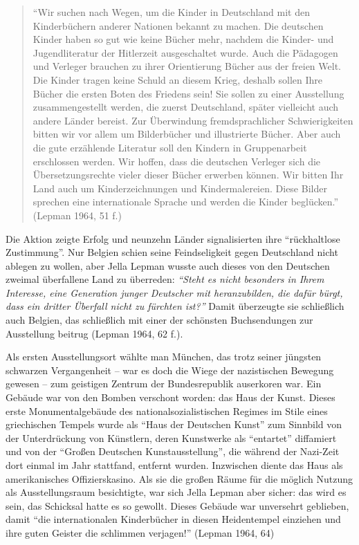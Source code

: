 \documentclass[a4paper,
fontsize=11pt,
oneside,
numbers=noperiodatend,
parskip=half-,
bibliography=totoc,
final
]{scrartcl}
\begin{document}
\begin{quote}
\enquote{Wir suchen nach Wegen, um die Kinder in Deutschland mit den
Kinderbüchern anderer Nationen bekannt zu machen. Die deutschen Kinder
haben so gut wie keine Bücher mehr, nachdem die Kinder- und
Jugendliteratur der Hitlerzeit ausgeschaltet wurde. Auch die Pädagogen
und Verleger brauchen zu ihrer Orientierung Bücher aus der freien Welt.
Die Kinder tragen keine Schuld an diesem Krieg, deshalb sollen Ihre
Bücher die ersten Boten des Friedens sein! Sie sollen zu einer
Ausstellung zusammengestellt werden, die zuerst Deutschland, später
vielleicht auch andere Länder bereist. Zur Überwindung fremdsprachlicher
Schwierigkeiten bitten wir vor allem um Bilderbücher und illustrierte
Bücher. Aber auch die gute erzählende Literatur soll den Kindern in
Gruppenarbeit erschlossen werden. Wir hoffen, dass die deutschen
Verleger sich die Übersetzungsrechte vieler dieser Bücher erwerben
können. Wir bitten Ihr Land auch um Kinderzeichnungen und
Kindermalereien. Diese Bilder sprechen eine internationale Sprache und
werden die Kinder beglücken.} (Lepman 1964, 51 f.)
\end{quote}

Die Aktion zeigte Erfolg und neunzehn Länder signalisierten ihre
\enquote{rückhaltlose Zustimmung}. Nur Belgien schien seine
Feindseligkeit gegen Deutschland nicht ablegen zu wollen, aber Jella
Lepman wusste auch dieses von den Deutschen zweimal überfallene Land zu
überreden: \emph{\enquote{Steht es nicht besonders in Ihrem Interesse,
eine Generation junger Deutscher mit heranzubilden, die dafür bürgt,
dass ein dritter Überfall nicht zu fürchten ist?}} Damit überzeugte sie
schließlich auch Belgien, das schließlich mit einer der schönsten
Buchsendungen zur Ausstellung beitrug (Lepman 1964, 62 f.).

Als ersten Ausstellungsort wählte man München, das trotz seiner jüngsten
schwarzen Vergangenheit -- war es doch die Wiege der nazistischen
Bewegung gewesen -- zum geistigen Zentrum der Bundesrepublik auserkoren
war. Ein Gebäude war von den Bomben verschont worden: das Haus der
Kunst. Dieses erste Monumentalgebäude des nationalsozialistischen
Regimes im Stile eines griechischen Tempels wurde als \enquote{Haus der
Deutschen Kunst} zum Sinnbild von der Unterdrückung von Künstlern, deren
Kunstwerke als \enquote{entartet} diffamiert und von der \enquote{Großen
Deutschen Kunstausstellung}, die während der Nazi-Zeit dort einmal im
Jahr stattfand, entfernt wurden. Inzwischen diente das Haus als
amerikanisches Offizierskasino. Als sie die großen Räume für die möglich
Nutzung als Ausstellungsraum besichtigte, war sich Jella Lepman aber
sicher: das wird es sein, das Schicksal hatte es so gewollt. Dieses
Gebäude war unversehrt geblieben, damit \enquote{die internationalen
Kinderbücher in diesen Heidentempel einziehen und ihre guten Geister die
schlimmen verjagen!} (Lepman 1964, 64)
\end{document}

